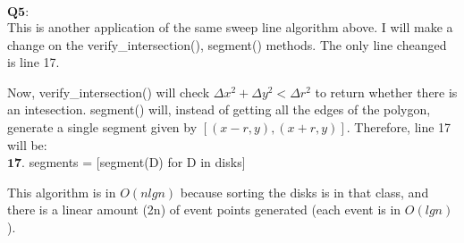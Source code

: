 \documentclass[]{article}
\begin{document}
	$\textbf{Q5:}$\\
	This is another application of the same sweep line algorithm above. I will make a change on the verify\_intersection(), segment() methods. The only line cheanged is line 17.
	
	Now, verify\_intersection() will check $\Delta x^2 + \Delta y^2 < \Delta r^2$ to return whether there is an intesection. segment() will, instead of getting all the edges of the polygon, generate a single segment given by $[(x-r,y), (x+r,y)]$. Therefore, line 17 will be:\\
	 $\textbf{17.}$ segments = [segment(D) for D in disks]
	 
	 This algorithm is in $O(nlgn)$ because sorting the disks is in that class, and there is a linear amount (2n) of event points generated (each event is in $O(lgn)$).
\end{document}
